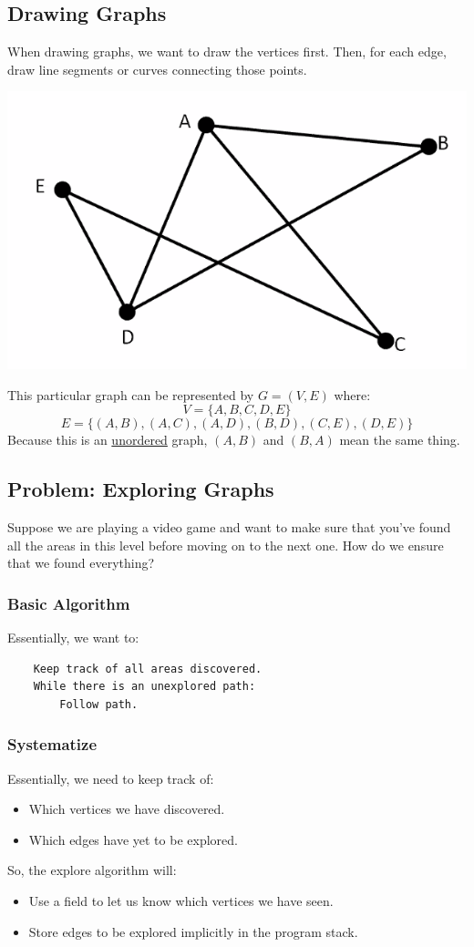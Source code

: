 \documentclass[letterpaper]{article}
\begin{document}
\subsection{Drawing Graphs}
When drawing graphs, we want to draw the vertices first. Then, for each edge, draw line segments or curves connecting those points. 
\begin{center}
    \includegraphics[scale=0.5]{assets/graph.png}
\end{center}
This particular graph can be represented by $G = (V, E)$ where: 
\[V = \{A, B, C, D, E\}\]
\[E = \{(A, B), (A, C), (A, D), (B, D), (C, E), (D, E)\}\]
Because this is an \underline{unordered} graph, $(A, B)$ and $(B, A)$ mean the same thing. 

\subsection{Problem: Exploring Graphs}
Suppose we are playing a video game and want to make sure that you've found all the areas in this level before moving on to the next one. How do we ensure that we found everything? 

\subsubsection{Basic Algorithm}
Essentially, we want to: 
\begin{verbatim}
    Keep track of all areas discovered.
    While there is an unexplored path:
        Follow path. 
\end{verbatim}

\subsubsection{Systematize}
Essentially, we need to keep track of: 
\begin{itemize}
    \item Which vertices we have discovered. 
    \item Which edges have yet to be explored.
\end{itemize}
So, the explore algorithm will:
\begin{itemize}
    \item Use a field  to let us know which vertices we have seen.
    \item Store edges to be explored implicitly in the program stack. 
\end{itemize}
\end{document}
